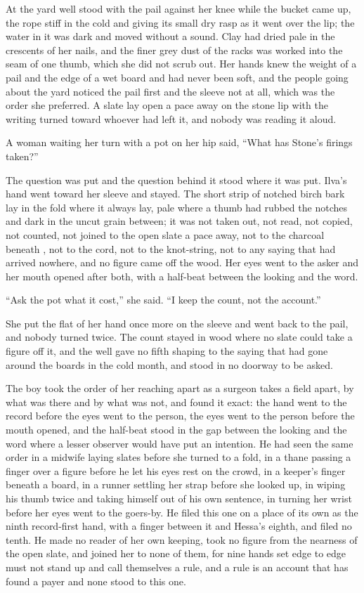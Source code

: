 At the yard well  stood with the pail against her knee while the bucket came up, the rope stiff in the  cold and giving its small dry rasp as it went over the lip; the water in it was dark and moved without a sound. Clay had dried pale in the crescents of her nails, and the finer grey dust of the racks was worked into the seam of one thumb, which she did not scrub out. Her hands knew the weight of a pail and the edge of a wet board and had never been soft, and the people going about the yard noticed the pail first and the sleeve not at all, which was the order she preferred. A slate lay open a pace away on the stone lip with the writing turned toward whoever had left it, and nobody was reading it aloud.

A woman waiting her turn with a pot on her hip said, “What has Stone's firings taken?”

The question was put and the question behind it stood where it was put. Ilva's hand went toward her sleeve and stayed. The short strip of notched birch bark lay in the fold where it always lay, pale where a thumb had rubbed the notches and dark in the uncut grain between; it was not taken out, not read, not copied, not counted, not joined to the open slate a pace away, not to the charcoal beneath , not to the cord, not to the knot-string, not to any saying that had arrived nowhere, and no figure came off the wood. Her eyes went to the asker and her mouth opened after both, with a half-beat between the looking and the word.

“Ask the pot what it cost,” she said. “I keep the count, not the account.”

She put the flat of her hand once more on the sleeve and went back to the pail, and nobody turned twice. The count stayed in wood where no slate could take a figure off it, and the well gave no fifth shaping to the saying that had gone around the boards in the cold month, and stood in no doorway to be asked.

\scenebreak

The boy took the order of her reaching apart as a surgeon takes a field apart, by what was there and by what was not, and found it exact: the hand went to the record before the eyes went to the person, the eyes went to the person before the mouth opened, and the half-beat stood in the gap between the looking and the word where a lesser observer would have put an intention. He had seen the same order in a midwife laying slates before she turned to a fold, in a thane passing a finger over a figure before he let his eyes rest on the crowd, in a keeper's finger beneath a board, in a runner settling her strap before she looked up, in  wiping his thumb twice and taking himself out of his own sentence, in  turning her wrist before her eyes went to the goers-by. He filed this one on a place of its own as the ninth record-first hand, with a finger between it and Hessa's eighth, and filed no tenth. He made no reader of her own keeping, took no figure from the nearness of the open slate, and joined her to none of them, for nine hands set edge to edge must not stand up and call themselves a rule, and a rule is an account that has found a payer and none stood to this one.

